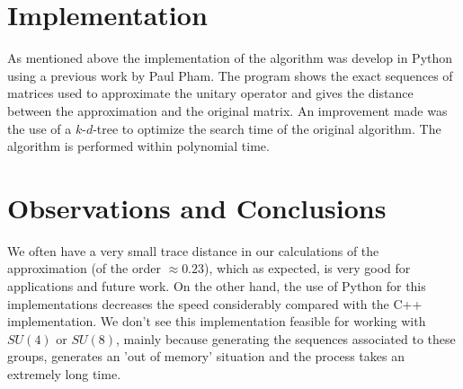 \documentclass[a0,portrait]{a0poster}
\begin{document}
\begin{multicols}{2}
		
		
		\color{SaddleBrown} %
		
		
		\color{DarkSlateGray} %
		
		\section*{Implementation}
		
		As mentioned above the implementation of the algorithm was develop in Python using a previous work by Paul Pham. The program shows the exact sequences of matrices used to approximate the unitary operator and gives the distance between the approximation and the original matrix. An improvement made was the use of a $k$-$d$-tree to optimize the search time of the original algorithm. The algorithm is performed within polynomial time.   
		
		
		\color{SaddleBrown}
		
		
		\section*{Observations and Conclusions}
		
		We often have a very small trace distance in our calculations of the approximation (of the order $ \approx 0.23 $), which as expected, is very good for applications and future work. On the other hand, the use of Python for this implementations decreases the speed considerably compared with the C++ implementation. We don't see this implementation feasible for working with $ SU(4) $ or $ SU(8) $, mainly because generating the sequences associated to these groups, generates an 'out of memory' situation and the process takes an extremely long time.  
		
		\color{DarkSlateGray}
		
		\printbibliography
		
		
		
		
	\end{multicols}
\end{document}
